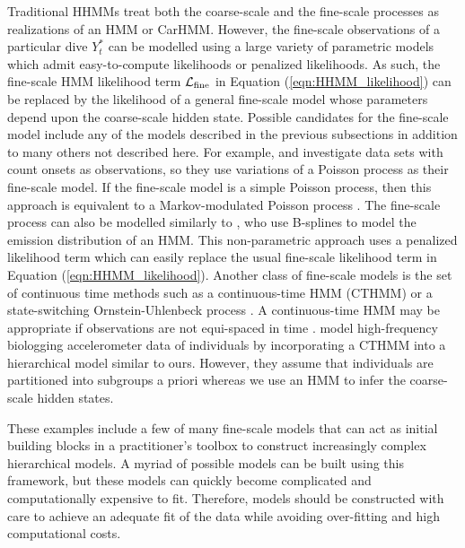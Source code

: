 Traditional HHMMs treat both the coarse-scale and the fine-scale processes as realizations of an HMM or CarHMM. 
However, the fine-scale observations of a particular dive $Y^*_t$ can be modelled using a large variety of parametric models which admit easy-to-compute likelihoods or penalized likelihoods. As such, the fine-scale HMM likelihood term $\mathcal{L}_{\text{fine}}$ in Equation (\ref{eqn:HHMM_likelihood}) can be replaced by the likelihood of a general fine-scale model whose parameters depend upon the coarse-scale hidden state.
%
Possible candidates for the fine-scale model include any of the models described in the previous subsections in addition to many others not described here. 
For example, \citet{Bebbington:2007} and \citet{Borchers:2013} investigate data sets with count onsets as observations, so they use variations of a Poisson process as their fine-scale model. If the fine-scale model is a simple Poisson process, then this approach is equivalent to a Markov-modulated Poisson process \citep{Fischer:1993}.
The fine-scale process can also be modelled similarly to \citet{Langrock:2018}, who use B-splines to model the emission distribution of an HMM. This non-parametric approach uses a penalized likelihood term which can easily replace the usual fine-scale likelihood term in Equation (\ref{eqn:HHMM_likelihood}). 
Another class of fine-scale models is the set of continuous time methods such as a continuous-time HMM (CTHMM) \citep{Liu:2015} or a state-switching Ornstein-Uhlenbeck process \citep{Michelot:2019}. 
A continuous-time HMM may be appropriate if observations are not equi-spaced in time \citep{Liu:2015}. \citet{Xu:2018} model high-frequency biologging accelerometer data of individuals by incorporating a CTHMM into a hierarchical model similar to ours. However, they assume that individuals are partitioned into subgroups a priori whereas we use an HMM to infer the coarse-scale hidden states.

These examples include a few of many fine-scale models that can act as initial building blocks in a practitioner's toolbox to construct increasingly complex hierarchical models. 
A myriad of possible models can be built using this framework, but these models can quickly become complicated and computationally expensive to fit. Therefore, models should be constructed with care to achieve an adequate fit of the data while avoiding over-fitting and high computational costs.